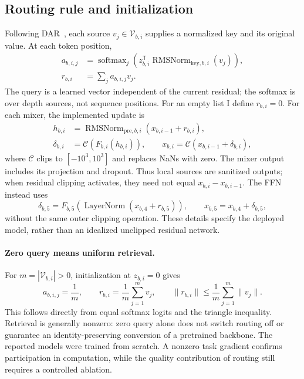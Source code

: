 \documentclass[10pt,a4paper]{article}
\begin{document}
\subsection{Routing rule and initialization}
Following DAR~\cite{dar}, each source $v_j\in\mathcal V_{b,i}$ supplies a normalized
key and its original value. At each token position,
\begin{align}
 a_{b,i,j}&=\operatorname{softmax}_{j}
 \left(z_{b,i}^{\mathsf T}\operatorname{RMSNorm}_{\mathrm{key},b,i}(v_j)\right),\\
 r_{b,i}&=\sum_j a_{b,i,j}v_j.\label{eq:dar}
\end{align}
The query is a learned vector independent of the current residual; the softmax is over
depth sources, not sequence positions. For an empty list I define $r_{b,i}=0$.
For each mixer, the implemented update is
\begin{align}
 h_{b,i}&=\operatorname{RMSNorm}_{\mathrm{pre},b,i}(x_{b,i-1}+r_{b,i}),\\
 \delta_{b,i}&=\mathcal C\!\left(F_{b,i}(h_{b,i})\right),\qquad
 x_{b,i}=\mathcal C(x_{b,i-1}+\delta_{b,i}),\label{eq:mixer}
\end{align}
where $\mathcal C$ clips to $[-10^3,10^3]$ and replaces NaNs with zero. The mixer
output includes its projection and dropout. Thus local sources are sanitized outputs;
when residual clipping activates, they need not equal $x_{b,i}-x_{b,i-1}$.
The FFN instead uses
\begin{equation}
 \delta_{b,5}=F_{b,5}\!\left(\operatorname{LayerNorm}(x_{b,4}+r_{b,5})\right),\qquad
 x_{b,5}=x_{b,4}+\delta_{b,5},
 \label{eq:ffn}
\end{equation}
without the same outer clipping operation. These details specify the deployed model,
rather than an idealized unclipped residual network.

\paragraph{Zero query means uniform retrieval.}
For $m=|\mathcal V_{b,i}|>0$, initialization at $z_{b,i}=0$ gives
\begin{equation}
 a_{b,i,j}=\frac1m,\qquad r_{b,i}=\frac1m\sum_{j=1}^{m}v_j,\qquad
 \|r_{b,i}\|\leq\frac1m\sum_{j=1}^{m}\|v_j\|.
 \label{eq:init}
\end{equation}
This follows directly from equal softmax logits and the triangle inequality. Retrieval
is generally nonzero: zero query alone does not switch routing off or guarantee an
identity-preserving conversion of a pretrained backbone. The reported models were trained
from scratch. A nonzero task gradient confirms participation in computation, while the
quality contribution of routing still requires a controlled ablation.
\end{document}
